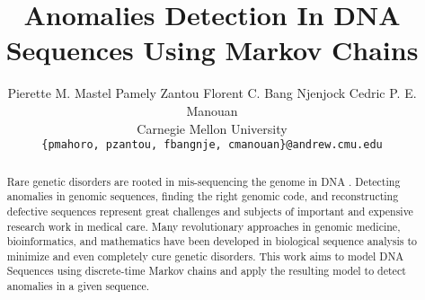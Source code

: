 \documentclass[10pt,twocolumn,letterpaper]{article}
\begin{document}
\title{Anomalies Detection In DNA Sequences Using Markov Chains}

\author{Pierette M. Mastel \quad Pamely Zantou \quad Florent C. Bang Njenjock \quad Cedric P. E. Manouan \\
Carnegie Mellon University\\
{\tt\small \{pmahoro, pzantou, fbangnje, cmanouan\}@andrew.cmu.edu}
}

\maketitle
\thispagestyle{empty}

\begin{abstract}
    Rare genetic disorders are rooted in mis-sequencing the
    genome in DNA \cite{posey}. Detecting anomalies in genomic sequences, finding the right genomic code, and reconstructing
    defective sequences represent great challenges and subjects
    of important and expensive research work in medical care.
    Many revolutionary approaches in genomic medicine, bioinformatics, and mathematics have been developed in biological
    sequence analysis to minimize and even completely cure
    genetic disorders. This work aims to model DNA Sequences
    using discrete-time Markov chains and apply the resulting model to detect anomalies in a given sequence.
\end{abstract}


\end{document}
